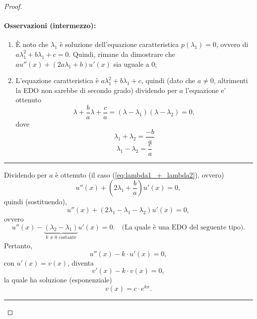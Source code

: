 \begin{proof}
\begin{enumerate}
		\paragraph{Osservazioni (intermezzo):}
		\begin{enumerate}
			\item È noto che $\lambda_1$ è soluzione dell'equazione caratteristica $p(\lambda_1)=0$, ovvero di $a\lambda_1^2+b\lambda_1 +c=0$. Quindi, rimane da dimostrare che $a u''(x)+(2a\lambda_1 + b)u'(x)$ sia uguale a 0;
			\item L'equazione caratteristica è $a\lambda_1^2+b\lambda_1 +c$, quindi (dato che $a\neq0$, altrimenti la EDO non sarebbe di secondo grado) dividendo per $a$ l'equazione e' ottenuto
			\begin{equation*}
				\lambda + \frac{b}{a} \lambda + \frac{c}{a}= (\lambda - \lambda_1)(\lambda - \lambda_2) = 0,
			\end{equation*}
			dove
			\begin{equation}\label{eq:lambda1_+_lambda2}
				\lambda_1 + \lambda_2 = \frac{-b}{a}
			\end{equation}
			\begin{equation*}
				\lambda_1 - \lambda_2 = \frac{c}{a}
			\end{equation*}
		\end{enumerate}
		\hrule\vspace{2px}
	
		\noindent Dividendo per $a$ è ottenuto (il caso (\ref{eq:lambda1_+_lambda2}), ovvero)
		\begin{equation*}
			u''(x)+\left(2\lambda_1+\frac{b}{a}\right)u'(x)=0,
		\end{equation*}
		quindi (sostituendo),
		\begin{equation*}
			u''(x) + (2\lambda_1 -\lambda_1-\lambda_2) u'(x) = 0,
		\end{equation*}
		ovvero
		\begin{equation*}
			u''(x) - \underbrace{(\lambda_2-\lambda_1)}_{k\neq 0\text{ costante}} u'(x) = 0.\quad\text{(La quale è una EDO del seguente tipo)}.
		\end{equation*}
		Pertanto,
		\begin{equation*}
			u''(x)- k\cdot u'(x) = 0,
		\end{equation*}
		con $u'(x)=v(x)$, diventa
		\begin{equation}\label{eq:edo_variabili_separabili_dimostrazione_integrale_generale_edo_seecondo_grado}
			v'(x) - k \cdot v(x)=0,
		\end{equation}
		la quale ha soluzione (esponenziale)
		\begin{equation*}
			v(x) = c \cdot e^{kx}.
		\end{equation*}
		\hrule\vspace{-7px}

\end{enumerate}
\end{proof}
